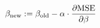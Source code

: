\documentclass[preview]{standalone}
\begin{document}
\begin{align*}
\special{dvisvgm:raw <g id='unique000'>}\beta_{\text{new}} := \beta_{\text{old}} - \alpha \cdot \frac{\partial \text{MSE}}{\partial \beta}\special{dvisvgm:raw </g>}
\end{align*}
\end{document}
